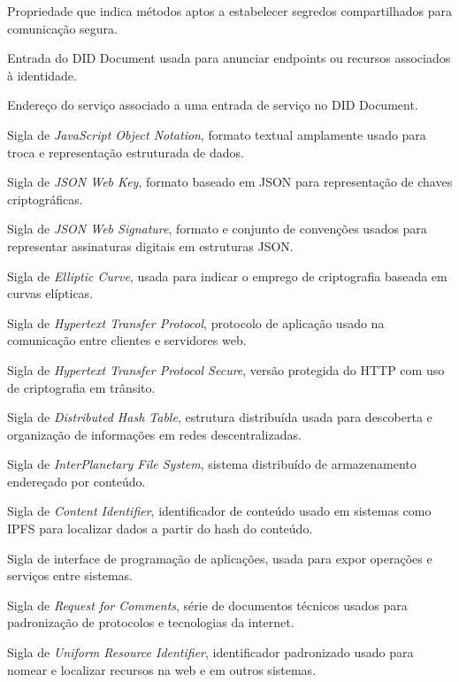 \begin{description}[
  font=\normalfont\bfseries,
  style=multiline,
  leftmargin=5.1cm,
  labelwidth=4.4cm,
  labelsep=0.35cm,
  itemsep=0.55\baselineskip
]
  \item[Key Agreement] Propriedade que indica métodos aptos a estabelecer segredos compartilhados para comunicação segura.
  \item[Service] Entrada do DID Document usada para anunciar endpoints ou recursos associados à identidade.
  \item[Service Endpoint] Endereço do serviço associado a uma entrada de serviço no DID Document.
  \item[JSON] Sigla de \textit{JavaScript Object Notation}, formato textual amplamente usado para troca e representação estruturada de dados.
  \item[JWK] Sigla de \textit{JSON Web Key}, formato baseado em JSON para representação de chaves criptográficas.
  \item[JWS] Sigla de \textit{JSON Web Signature}, formato e conjunto de convenções usados para representar assinaturas digitais em estruturas JSON.
  \item[EC] Sigla de \textit{Elliptic Curve}, usada para indicar o emprego de criptografia baseada em curvas elípticas.
  \item[HTTP] Sigla de \textit{Hypertext Transfer Protocol}, protocolo de aplicação usado na comunicação entre clientes e servidores web.
  \item[HTTPS] Sigla de \textit{Hypertext Transfer Protocol Secure}, versão protegida do HTTP com uso de criptografia em trânsito.
  \item[DHT] Sigla de \textit{Distributed Hash Table}, estrutura distribuída usada para descoberta e organização de informações em redes descentralizadas.
  \item[IPFS] Sigla de \textit{InterPlanetary File System}, sistema distribuído de armazenamento endereçado por conteúdo.
  \item[CID] Sigla de \textit{Content Identifier}, identificador de conteúdo usado em sistemas como IPFS para localizar dados a partir do hash do conteúdo.
  \item[API] Sigla de interface de programação de aplicações, usada para expor operações e serviços entre sistemas.
  \item[RFC] Sigla de \textit{Request for Comments}, série de documentos técnicos usados para padronização de protocolos e tecnologias da internet.
  \item[URI] Sigla de \textit{Uniform Resource Identifier}, identificador padronizado usado para nomear e localizar recursos na web e em outros sistemas.
\end{description}
